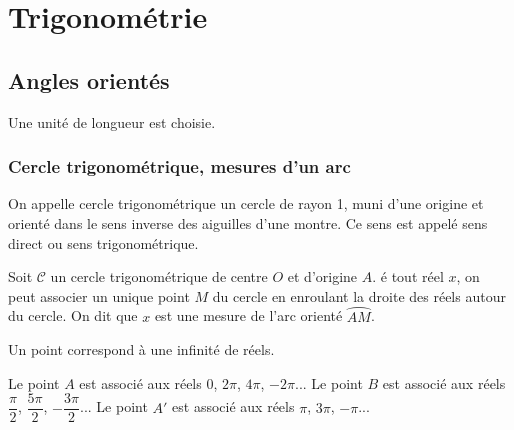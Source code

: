 \documentclass[french]{book}
\newcommand{\arc}[1]{\wideparen{#1}}
\newcommand{\calc}{\mathscr{C}}
\begin{document}
\tableofcontents
\setcounter{chapter}{4}
\chapter{Trigonom\'etrie}

\section{Angles orientés}
Une unité de longueur est choisie.
\subsection{Cercle trigonométrique, mesures d'un arc}
\begin{minipage}{10cm}
\begin{defn}
On appelle cercle trigonométrique un cercle de rayon 1, muni d'une origine et orienté dans le sens inverse des aiguilles d'une montre. Ce sens est appelé sens direct ou sens trigonométrique.
\par Soit $\calc$ un cercle trigonométrique de centre $O$ et d'origine $A$. é tout réel $x$, on peut associer un unique point $M$ du cercle en \og enroulant\fg{} la droite des réels autour du cercle. On dit que $x$ est une mesure de l'arc orienté $\arc{AM}$.
\end{defn}

\begin{rem}
Un point correspond à une infinité de réels.
\end{rem}

\begin{exemple}
Le point $A$ est associé aux réels 0, $2\pi$, $4\pi$, $-2\pi$...
Le point $B$ est associé aux réels $\dfrac{\pi}{2}$, $\dfrac{5\pi}{2}$, $-\dfrac{3\pi}{2}$...
Le point $A'$ est associé aux réels $\pi$, $3\pi$, $-\pi$...
\end{exemple}
\end{minipage}
\hfill
\end{document}
